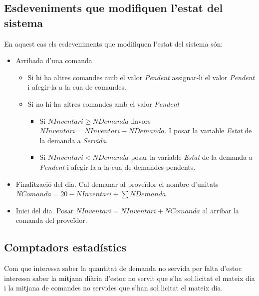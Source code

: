 \documentclass[a4paper]{article}
\begin{document}
\subsection{Esdeveniments que modifiquen l'estat del sistema}
En aquest cas els esdeveniments que modifiquen l'estat del sistema són:
\begin{itemize}
	\item Arribada d'una comanda
	\begin{itemize}
		\item Si hi ha altres comandes amb el valor \emph{Pendent} assignar-li el valor \emph{Pendent} i afegir-la a la cua de comandes.
		\item Si no hi ha altres comandes amb el valor \emph{Pendent}
		\begin{itemize}
			\item Si $NInventari \ge NDemanda$ llavors $NInventari = NInventari - NDemanda$. I posar la variable \emph{Estat} de la demanda a \emph{Servida}.
			\item Si $NInventari < NDemanda$ posar la variable \emph{Estat} de la demanda a \emph{Pendent} i afegir-la a la cua de demandes pendents.
		\end{itemize}
	\end{itemize}
	\item Finalització del dia. Cal demanar al proveïdor el nombre d'unitats $NComanda = 20 - NInventari + \sum NDemanda$.
	\item Inici del dia. Posar $NInventari = NInventari + NComanda$ al arribar la comanda del proveïdor.
\end{itemize}

\subsection{Comptadors estadístics}
Com que interessa saber la quantitat de demanda no servida per falta d'estoc interessa saber la mitjana diària d'estoc no servit que s'ha so\l.licitat el mateix dia i la mitjana de comandes no servides que s'han so\l.licitat el mateix dia.
\end{document}
